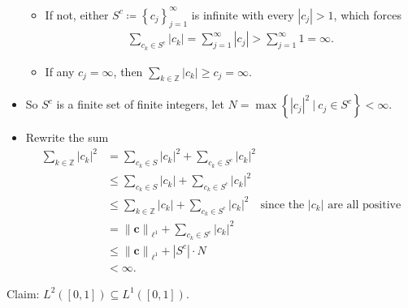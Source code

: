 \begin{solution}
\begin{itemize}
  \begin{itemize}
  \tightlist
  \item
    If not, either \(S^c \coloneqq\left\{{c_j}\right\}_{j=1}^\infty\) is
    infinite with every \({\left\lvert {c_j} \right\rvert} > 1\), which
    forces
    \begin{align*}\sum_{c_k\in S^c} {\left\lvert {c_k} \right\rvert} = \sum_{j=1}^\infty {\left\lvert {c_j} \right\rvert} > \sum_{j=1}^\infty 1 = \infty.\end{align*}
  \item
    If any \(c_j = \infty\), then
    \(\sum_{k\in {\mathbb{Z}}} {\left\lvert {c_k} \right\rvert} \geq c_j = \infty\).
  \end{itemize}
\item
  So \(S^c\) is a finite set of finite integers, let
  \(N = \max \left\{{{\left\lvert {c_j} \right\rvert}^2 {~\mathrel{\Big|}~}c_j \in S^c}\right\} < \infty\).
\item
  Rewrite the sum
  \begin{align*}
  \sum_{k\in {\mathbb{Z}}} {\left\lvert {c_k} \right\rvert}^2 
  &= \sum_{c_k\in S} {\left\lvert {c_k} \right\rvert}^2 + \sum_{c_k \in S^c} {\left\lvert {c_k} \right\rvert}^2 \\
  &\leq \sum_{c_k\in S} {\left\lvert {c_k} \right\rvert} + \sum_{c_k \in S^c} {\left\lvert {c_k} \right\rvert}^2 \\
  &\leq \sum_{k\in {\mathbb{Z}}} {\left\lvert {c_k} \right\rvert} + \sum_{c_k \in S^c} {\left\lvert {c_k} \right\rvert}^2 \quad\text{since the ${\left\lvert {c_k} \right\rvert}$ are all positive} \\
  &= {\left\lVert {\mathbf{c}} \right\rVert}_{\ell^1} + \sum_{c_k \in S^c} {\left\lvert {c_k} \right\rvert}^2 \\
  &\leq {\left\lVert {\mathbf{c}} \right\rVert}_{\ell^1} + {\left\lvert {S^c} \right\rvert}\cdot N \\
  &< \infty
  .\end{align*}
\end{itemize}

Claim: \(L^2([0, 1]) \subseteq L^1([0, 1])\).


\end{solution}
